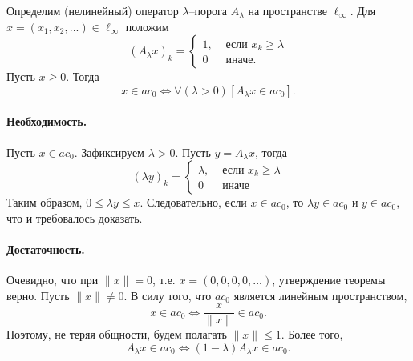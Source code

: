 \begin{theorem}
	\label{thm:ac0_threshold}
	Определим (нелинейный) оператор $\lambda$--порога $A_\lambda$ на пространстве $\ell_\infty$.
	Для $x = (x_1, x_2, ...) \in \ell_\infty$ положим
	\begin{equation}
		(A_\lambda x)_k = \begin{cases}
			1, & \mbox{~если~} x_k \geq \lambda
			\\
			0  & \mbox{~иначе.~}
		\end{cases}
	\end{equation}
	Пусть $x\geq 0$.
	Тогда
	\begin{equation}
		x\in ac_0 \Leftrightarrow
		\forall(\lambda>0)[A_\lambda x \in ac_0]
		.
	\end{equation}
\end{theorem}

\paragraph{Необходимость.}
Пусть $x\in ac_0$.
Зафиксируем $\lambda > 0$.
Пусть $y=A_\lambda x$, тогда
\begin{equation}
	(\lambda y)_k = \begin{cases}
		\lambda, & \mbox{~если~} x_k \geq \lambda
		\\
		0  & \mbox{~иначе~}
	\end{cases}
\end{equation}
Таким образом, $0 \leq \lambda y \leq x$.
Следовательно, если $x \in ac_0$,
то $\lambda y \in ac_0$ и $y \in ac_0$,
что и требовалось доказать.

\paragraph{Достаточность.}
Очевидно, что при $\|x\| = 0$, т.е. $x = (0,0,0,0,...)$,
утверждение теоремы верно.
Пусть $\|x\| \ne 0$.
В силу того, что $ac_0$ является линейным пространством,
\begin{equation}
	x\in ac_0 \Leftrightarrow
	\frac{x}{\|x\|}\in ac_0
	.
\end{equation}
Поэтому, не теряя общности, будем полагать $\|x\|\leq 1$.
Более того,
\begin{equation}
	A_\lambda x \in ac_0 \Leftrightarrow
	(1-\lambda)A_\lambda x \in ac_0
	.
\end{equation}

